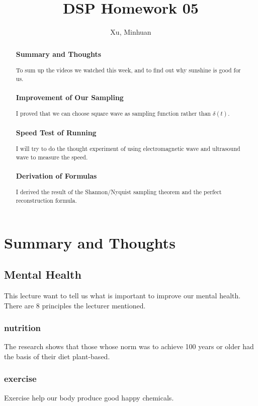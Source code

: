 \documentclass{article}
\begin{document}
\title{DSP Homework 05}
\author{Xu, Minhuan}
\maketitle
\tableofcontents
\begin{abstract}
    \subsubsection*{Summary and Thoughts} To sum up the videos we watched this week, and to find out why sunshine is
     good for us.
    \subsubsection*{Improvement of Our Sampling} I proved that we can choose square wave as sampling function rather
     than $\delta(t)$.
    \subsubsection*{Speed Test of Running} I will try to do the thought experiment of using electromagnetic wave and
     ultrasound wave to measure the speed.
    \subsubsection*{Derivation of Formulas} I derived the result of the Shannon/Nyquist sampling theorem and the perfect
     reconstruction formula.
\end{abstract}

\section{Summary and Thoughts}

\subsection{Mental Health} This lecture want to tell us what is important to improve our mental health. There are 8
 principles the lecturer mentioned.
\subsubsection*{nutrition} The research shows that those whose norm was to achieve 100 years or older had the basis of
 their diet plant-based.
\subsubsection*{exercise} Exercise help our body produce good happy chemicals.
\end{document}
